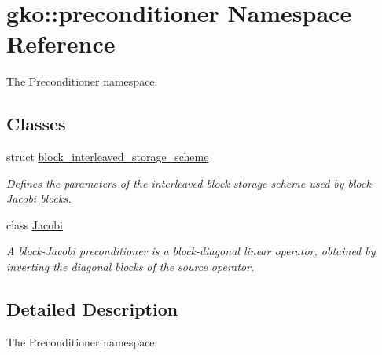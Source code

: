 \hypertarget{namespacegko_1_1preconditioner}{}\section{gko\+:\+:preconditioner Namespace Reference}
\label{namespacegko_1_1preconditioner}


The Preconditioner namespace.  


\subsection*{Classes}
\begin{DoxyCompactItemize}
\item 
struct \hyperlink{structgko_1_1preconditioner_1_1block__interleaved__storage__scheme}{block\+\_\+interleaved\+\_\+storage\+\_\+scheme}
\begin{DoxyCompactList}\small\item\em Defines the parameters of the interleaved block storage scheme used by block-\/\+Jacobi blocks. \end{DoxyCompactList}\item 
class \hyperlink{classgko_1_1preconditioner_1_1Jacobi}{Jacobi}
\begin{DoxyCompactList}\small\item\em A block-\/\+Jacobi preconditioner is a block-\/diagonal linear operator, obtained by inverting the diagonal blocks of the source operator. \end{DoxyCompactList}\end{DoxyCompactItemize}


\subsection{Detailed Description}
The Preconditioner namespace. 